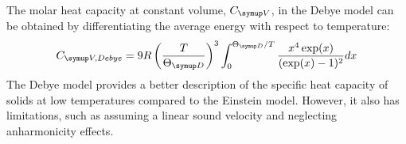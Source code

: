 The molar heat capacity at constant volume, $C\idx{V}$, in the Debye model can be obtained by differentiating the average energy with 
respect to temperature:
\begin{equation*}
    C\idx{V, Debye} = 9R\left(\frac{T}{\Theta\idx{D}}\right)^3\int_{0}^{\Theta\idx{D}/T} \frac{x^4\exp(x)}{(\exp(x)-1)^2} dx
\end{equation*}
The Debye model provides a better description of the specific heat capacity of solids at low temperatures compared to the Einstein model. 
However, it also has limitations, such as assuming a linear sound velocity and neglecting anharmonicity effects.
 

